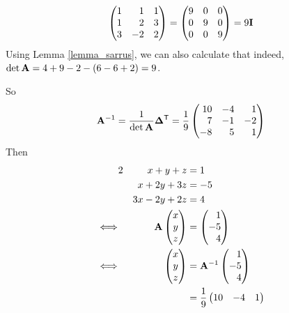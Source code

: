 \documentclass[fleqn,a4paper,11pt]{article}
\begin{document}
\begin{enumerate}[label=\textbf{\arabic*.}]
\begin{equation*}
    \begin{pmatrix*}[r]
     1 & 1 & 1 \\
     1 & 2 & 3 \\
     3 & -2 & 2
    \end{pmatrix*}
    = \begin{pmatrix}
     9 & 0 & 0 \\
     0 & 9 & 0 \\
     0 & 0 & 9
    \end{pmatrix}
    = 9\mat I
   \end{equation*}
   Using Lemma \ref{lemma_sarrus}, we can also calculate that indeed,
   \(\det \mathbf{A} = 4 + 9 - 2 - (6 - 6 + 2) = 9\).

   So
   \begin{equation*}
    \mat A^{-1}
     = \frac 1{\det \mat A} \tran{\mat \Delta}
     = \frac 19
     \begin{pmatrix*}[r]
      10 & -4 & 1 \\
      7 & -1 & -2 \\
      -8 & 5 & 1
     \end{pmatrix*}
   \end{equation*}
   Then
   \begin{alignat*}2
    && x + y + z &= 1 \\
    && x + 2y + 3z &= -5 \\
    && 3x - 2y + 2z &= 4 \\
    \iff{}&&
     \mat A\begin{pmatrix} x \\ y \\ z \end{pmatrix}
      &= \begin{pmatrix*}[r] 1 \\ -5 \\ 4 \end{pmatrix*} \\
    \iff{}&&
     \begin{pmatrix} x \\ y \\ z \end{pmatrix}
      &= \mat A^{-1}\begin{pmatrix*}[r] 1 \\ -5 \\ 4 \end{pmatrix*} \\
    && &=
    \frac 19
    \begin{pmatrix*}[r]
     10 & -4 & 1 \\

\end{pmatrix*}
\end{alignat*}
\end{enumerate}
\end{document}
